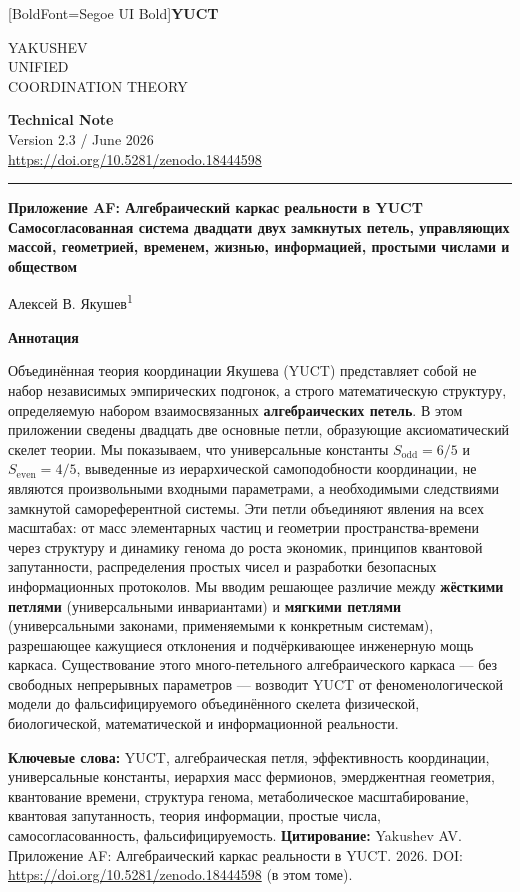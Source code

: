 \documentclass[12pt,a4paper]{article}
\newcommand{\makeheader}{%
	\noindent
	\begin{minipage}{0.17\textwidth}
		\raggedright
		{\fontspec{Segoe UI}[BoldFont=Segoe UI Bold]\bfseries\color{skyblue}\fontsize{46}{46}\selectfont YUCT}%
	\end{minipage}%
	\hspace{30pt}
	\begin{minipage}{0.32\textwidth}
		\raggedright
		{\sffamily\fontsize{11}{13}\selectfont YAKUSHEV\\ UNIFIED\\ COORDINATION THEORY}%
	\end{minipage}%
	\hfill
	\begin{minipage}{0.38\textwidth}
		\raggedleft
		{\sffamily\bfseries Technical Note}\\ 
		{\sffamily Version 2.3 / June 2026}\\ 
		{\sffamily\footnotesize \mbox{\url{https://doi.org/10.5281/zenodo.18444598}}}%
	\end{minipage}
	\par\vspace{5pt}
	\noindent\textcolor{gold}{\rule{\textwidth}{1.6pt}}
	\par\vspace{0pt}
}
\begin{document}
	
	\thispagestyle{firstpage}
	\makeheader
	
	\vspace{0cm}
	{\LARGE\bfseries Приложение AF: Алгебраический каркас реальности в YUCT \\ 
		\Large Самосогласованная система двадцати двух замкнутых петель, управляющих массой, геометрией, временем, жизнью, информацией, простыми числами и обществом \par}
	\vspace{0.2cm}
	
	{\large Алексей В. Якушев\textsuperscript{1}} \\
	\vspace{0.0cm}
	
	{\color{darkblue}\textbf{\LARGE Аннотация}} \par
	{\large
		\noindent
		Объединённая теория координации Якушева (YUCT) представляет собой не набор независимых эмпирических подгонок, а строго математическую структуру, определяемую набором взаимосвязанных \textbf{алгебраических петель}. В этом приложении сведены двадцать две основные петли, образующие аксиоматический скелет теории. Мы показываем, что универсальные константы \(S_{\mathrm{odd}} = 6/5\) и \(S_{\mathrm{even}} = 4/5\), выведенные из иерархической самоподобности координации, не являются произвольными входными параметрами, а необходимыми следствиями замкнутой самореферентной системы. Эти петли объединяют явления на всех масштабах: от масс элементарных частиц и геометрии пространства-времени через структуру и динамику генома до роста экономик, принципов квантовой запутанности, распределения простых чисел и разработки безопасных информационных протоколов. Мы вводим решающее различие между \textbf{жёсткими петлями} (универсальными инвариантами) и \textbf{мягкими петлями} (универсальными законами, применяемыми к конкретным системам), разрешающее кажущиеся отклонения и подчёркивающее инженерную мощь каркаса. Существование этого много-петельного алгебраического каркаса — без свободных непрерывных параметров — возводит YUCT от феноменологической модели до фальсифицируемого объединённого скелета физической, биологической, математической и информационной реальности.}
	
	\vspace{0.1cm}
	\noindent
	{\color{darkblue}\textbf{Ключевые слова:}} YUCT, алгебраическая петля, эффективность координации, универсальные константы, иерархия масс фермионов, эмерджентная геометрия, квантование времени, структура генома, метаболическое масштабирование, квантовая запутанность, теория информации, простые числа, самосогласованность, фальсифицируемость.
	\vspace{0.1cm}
	\noindent
	{\color{darkblue}\textbf{Цитирование:}} Yakushev AV. Приложение AF: Алгебраический каркас реальности в YUCT. 2026. DOI: \url{https://doi.org/10.5281/zenodo.18444598} (в этом томе).
	
\end{document}
